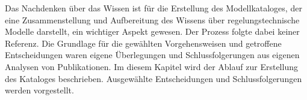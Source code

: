 Das Nachdenken über das Wissen ist für die Erstellung des Modellkataloges, der eine Zusammenstellung und Aufbereitung des Wissens über regelungstechnische Modelle darstellt, ein wichtiger Aspekt gewesen. Der Prozess folgte dabei keiner Referenz. Die Grundlage für die gewählten Vorgehensweisen und getroffene Entscheidungen waren eigene Überlegungen und Schlussfolgerungen aus eigenen Analysen von Publikationen. Im diesem Kapitel wird der Ablauf zur Erstellung des Kataloges beschrieben. Ausgewählte Entscheidungen und Schlussfolgerungen werden vorgestellt. %

